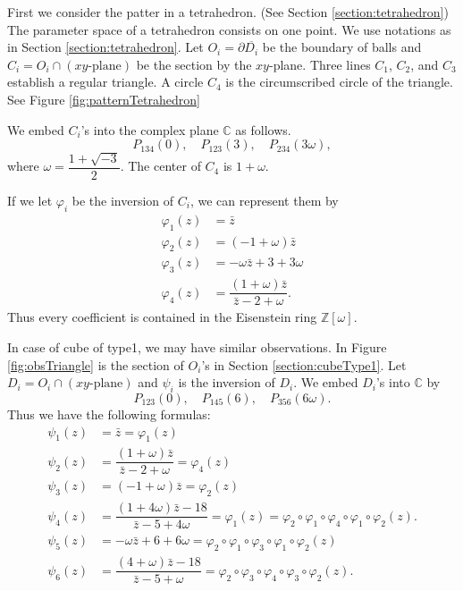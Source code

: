 \documentclass[suppldata, dvipdfmx]{interact}
\theoremstyle{plain}%
\theoremstyle{definition}
\theoremstyle{remark}
\theoremstyle{problemstyle}
\begin{document}
First we consider the patter in a tetrahedron. (See Section \ref{section:tetrahedron}) 
The parameter space of a tetrahedron consists on one point.
We use notations as in Section \ref{section:tetrahedron}.  
Let $O_i = \partial \overline{D_i}$ be the boundary of balls and $C_i= O_i\cap(xy\text{-plane})$ be the section by the $xy$-plane.  
Three lines $C_1$, $C_2$, and $C_3$ establish a regular triangle. 
A circle $C_4$ is the circumscribed circle of the triangle.  
See Figure \ref{fig:patternTetrahedron}

We embed $C_i$'s into the complex plane $\mathbb{C}$ as follows.
\[
P_{134}(0),\quad P_{123}(3),\quad P_{234}(3\omega),
\]
where $\omega = \dfrac{1+\sqrt{-3}}{2}$.  The center of $C_4$ is $1+\omega$.

If we let $\varphi_i$ be the inversion of $C_i$, we can represent them by
\begin{align*}
\varphi_1 (z) &= \bar z \\
\varphi_2 (z) &= (-1+\omega)\bar z \\
\varphi_3 (z) &= -\omega\bar z+3+3\omega \\
\varphi_4 (z) &= \dfrac{(1+\omega)\bar z}{\bar z-2+\omega}.
\end{align*}
Thus every coefficient is contained in the Eisenstein ring $\mathbb{Z}[\omega]$.  

In case of cube of type1, we may have similar observations. In Figure \ref{fig:obsTriangle} is the section of $O_i$'s in Section \ref{section:cubeType1}.
Let $D_i=O_i\cap(xy\text{-plane})$ and $\psi_i$ is the inversion of $D_i$.  We embed $D_i$'s into $\mathbb{C}$ by 
\[
P_{123}(0),\quad P_{145}(6),\quad P_{356}(6\omega).
\]
Thus we have the following formulas:
\begin{align*}
\psi_1 (z) &= \bar z  = \varphi_1(z)\\
\psi_2 (z) &= \dfrac{(1+\omega)\bar z}{\bar z-2+\omega} = \varphi_4(z) \\
\psi_3 (z) &= (-1+\omega)\bar z = \varphi_2(z)\\
\psi_4 (z) &= \dfrac{(1+4\omega)\bar z - 18}{\bar z-5+4\omega} = \varphi_1(z)
=\varphi_2\circ\varphi_1\circ\varphi_4\circ\varphi_1\circ\varphi_2(z).\\
\psi_5 (z) &= -\omega\bar z+6+6\omega 
=\varphi_2\circ\varphi_1\circ\varphi_3\circ\varphi_1\circ\varphi_2(z)\\
\psi_6 (z) &= \dfrac{(4+\omega)\bar z - 18}{\bar z-5+\omega} 
=\varphi_2\circ\varphi_3\circ\varphi_4\circ\varphi_3\circ\varphi_2(z).
\end{align*}
\end{document}
